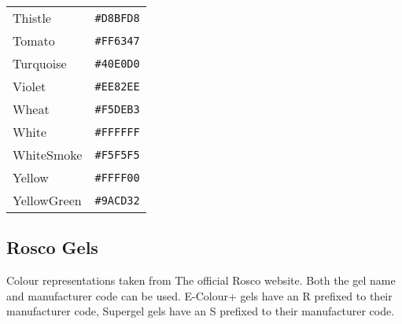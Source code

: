 \documentclass[a4paper]{article}
\begin{document}
\begin{longtable}{|l|r|}
Thistle & \texttt{\#D8BFD8} \cellcolor[HTML]{D8BFD8} \\
Tomato & \texttt{\#FF6347} \cellcolor[HTML]{FF6347} \\
Turquoise & \texttt{\#40E0D0} \cellcolor[HTML]{40E0D0} \\
Violet & \texttt{\#EE82EE} \cellcolor[HTML]{EE82EE} \\
Wheat & \texttt{\#F5DEB3} \cellcolor[HTML]{F5DEB3} \\
White & \texttt{\#FFFFFF} \cellcolor[HTML]{FFFFFF} \\
WhiteSmoke & \texttt{\#F5F5F5} \cellcolor[HTML]{F5F5F5} \\
Yellow & \texttt{\#FFFF00} \cellcolor[HTML]{FFFF00} \\
YellowGreen & \texttt{\#9ACD32} \cellcolor[HTML]{9ACD32} \\
\hline
\end{longtable}

\subsection{Rosco Gels}
Colour representations taken from The official Rosco website. Both the gel name 
and manufacturer code can be used. E-Colour+ gels have an R prefixed to their 
manufacturer code, Supergel gels have an S prefixed to their manufacturer code.
\end{document}
